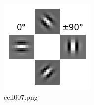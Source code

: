 \begin{figure}[ht]
	\centering
	\includegraphics[scale=0.8, max width=\linewidth]{./fig/bayesian-brain/neural-sampling/cell007.png}
	\caption{cell007.png}
	\label{cell007.png}
\end{figure}

